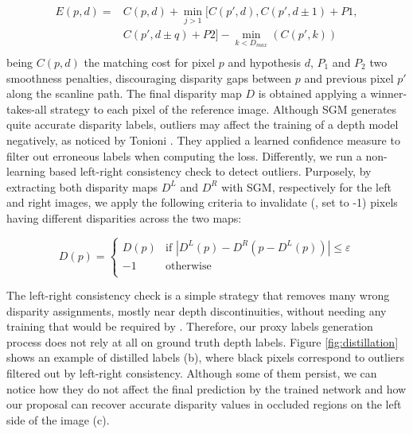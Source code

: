 \documentclass[10pt,twocolumn,letterpaper]{article}
\begin{document}
\begin{equation}\label{eq:sgm}
\begin{split}
E(p,d) = &C(p,d) + \min_{j>1}[C(p',d),C(p',d\pm1)+P1, \\ &C(p',d\pm q)+P2] -\min_{k<D_{max}}(C(p',k)) \\
\end{split}
\end{equation}
being $C(p,d)$ the matching cost for pixel $p$ and hypothesis $d$, $P_1$ and $P_2$ two smoothness penalties, discouraging disparity gaps between $p$ and previous pixel $p'$ along the scanline path. The final disparity map $D$ is obtained applying a winner-takes-all strategy to each pixel of the reference image. Although SGM generates quite accurate disparity labels, outliers may affect the training of a depth model negatively, as noticed by Tonioni \etal \cite{Tonioni_2017_ICCV}. They applied a learned confidence measure \cite{Poggi_2016_BMVC} to filter out erroneous labels when computing the loss. Differently, we run a non-learning based left-right consistency check to detect outliers. Purposely, by extracting both disparity maps $D^L$ and $D^R$ with SGM, respectively for the left and right images, we apply the following criteria to invalidate (\ie, set to -1) pixels having different disparities across the two maps:

\begin{equation}\label{eq:lrc}
    D(p)=
\begin{cases}
D(p) & \text{if } |D^L(p)-D^R(p-D^L(p))|\leq \varepsilon \\
-1 & \text{otherwise } \\
\end{cases}
\end{equation}

The left-right consistency check is a simple strategy that removes many wrong disparity assignments, mostly near depth discontinuities, without needing any training that would be required by \cite{Tonioni_2017_ICCV}. Therefore, our proxy labels generation process does not rely at all on ground truth depth labels. 
Figure \ref{fig:distillation} shows an example of distilled labels (b), where black pixels correspond to outliers filtered out by left-right consistency. Although some of them persist, we can notice how they do not affect the final prediction by the trained network and how our proposal can recover accurate disparity values in occluded regions on the left side of the image (c).
\end{document}
